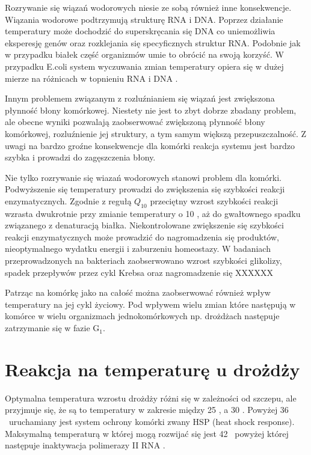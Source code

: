 \documentclass{pracamgr}
\begin{document}
Rozrywanie się wiązań wodorowych niesie ze sobą również inne konsekwencje. Wiązania wodorowe podtrzymują strukturę RNA i DNA. Poprzez działanie temperatury może dochodzić do superskręcania się DNA co uniemożliwia 
eksperesję genów oraz rozklejania się specyficznych struktur RNA. Podobnie jak w przypadku białek część organizmów umie to obrócić na swoją korzyść. W przypadku E.coli system wyczuwania zmian temperatury opiera się
w dużej mierze na różnicach w topnieniu RNA i DNA\cite{TsInEubact} \cite{Digel08}.

Innym problemem związanym z rozluźnianiem się wiązań jest zwiększona płynność błony komórkowej. Niestety nie jest to zbyt dobrze zbadany problem\cite{Membranefluidity}, ale obecne wyniki pozwalają zaobserwować zwiększoną
płynność błony komórkowej, rozluźnienie jej struktury, a tym samym większą przepuszczalność. Z uwagi na bardzo groźne konsekwencje dla komórki reakcja systemu jest bardzo szybka i prowadzi do zagęszczenia błony.

Nie tylko rozrywanie się wiazań wodorowych stanowi problem dla komórki. Podwyższenie się temperatury prowadzi do zwiększenia się szybkości reakcji enzymatycznych. Zgodnie z regułą $Q_{10}$ przeciętny wzrost
szybkości reakcji wzrasta dwukrotnie przy zmianie temperatury o 10 \textcelsius, aż do gwałtownego spadku związanego z denaturacją białka\cite{}. Niekontrolowane zwiększenie się szybkości reakcji enzymatycznych
może prowadzić do nagromadzenia się produktów, nieoptymalnego wydatku energii i zaburzeniu homeostazy. W badaniach przeprowadzonych na bakteriach zaobserwowano wzrost szybkości glikolizy, spadek przepływów przez 
cykl Krebsa oraz nagromadzenie się XXXXXX \cite{Wittmann07}

Patrząc na komórkę jako na całość można zaobserwować również wpływ temperatury na jej cykl życiowy. Pod wpływem wielu zmian które następują w komórce w wielu organizmach jednokomórkowych np. drożdżach 
następuje zatrzymanie się w fazie G$_1$.

\section{Reakcja na temperaturę u drożdży}

Optymalna temperatura wzrostu drożdży różni się w zależności od szczepu, ale przyjmuje się, że są to temperatury w 
zakresie między 25 \textcelsius, a 30 \textcelsius. Powyżej 36 \textcelsius\ uruchamiany jest system ochrony komórki
zwany HSP (heat shock response). Maksymalną temperaturą  w której mogą rozwijać się jest 42 \textcelsius\ powyżej której 
następuje inaktywacja polimerazy II RNA \cite{Morano12}.
\end{document}
